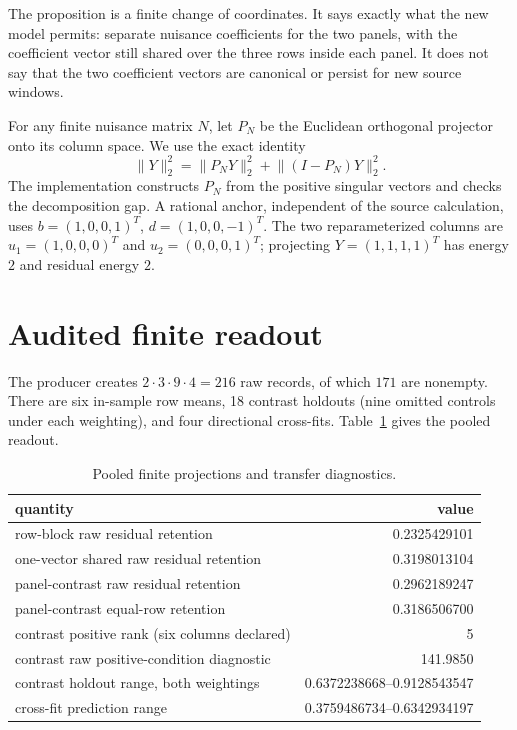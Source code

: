 \documentclass[11pt]{article}
\newcommand{\norm}[1]{\lVert #1\rVert_2}
\begin{document}
The proposition is a finite change of coordinates.  It says exactly what the
new model permits: separate nuisance coefficients for the two panels, with
the coefficient vector still shared over the three rows inside each panel.
It does not say that the two coefficient vectors are canonical or persist for
new source windows.

For any finite nuisance matrix $N$, let $P_N$ be the Euclidean orthogonal
projector onto its column space.  We use the exact identity
\[
\norm{Y}^2=\norm{P_NY}^2+\norm{(I-P_N)Y}^2.                 \tag{1}
\]
The implementation constructs $P_N$ from the positive singular vectors and
checks the decomposition gap.  A rational anchor, independent of the source
calculation, uses
$b=(1,0,0,1)^T$, $d=(1,0,0,-1)^T$.  The two reparameterized columns are
$u_1=(1,0,0,0)^T$ and $u_2=(0,0,0,1)^T$; projecting
$Y=(1,1,1,1)^T$ has energy $2$ and residual energy $2$.

\section{Audited finite readout}

The producer creates $2\cdot3\cdot9\cdot4=216$ raw records, of which $171$
are nonempty.  There are six in-sample row means, 18 contrast holdouts
(nine omitted controls under each weighting), and four directional cross-fits.
Table~\ref{tab:main} gives the pooled readout.

\begin{table}[ht]
\centering
\caption{Pooled finite projections and transfer diagnostics.}
\label{tab:main}
\begin{tabular}{lr}
\toprule
quantity & value\\
\midrule
row-block raw residual retention & 0.2325429101\\
one-vector shared raw residual retention & 0.3198013104\\
panel-contrast raw residual retention & 0.2962189247\\
panel-contrast equal-row retention & 0.3186506700\\
contrast positive rank (six columns declared) & 5\\
contrast raw positive-condition diagnostic & 141.9850\\
contrast holdout range, both weightings & 0.6372238668--0.9128543547\\
cross-fit prediction range & 0.3759486734--0.6342934197\\
\bottomrule
\end{tabular}
\end{table}
\end{document}

